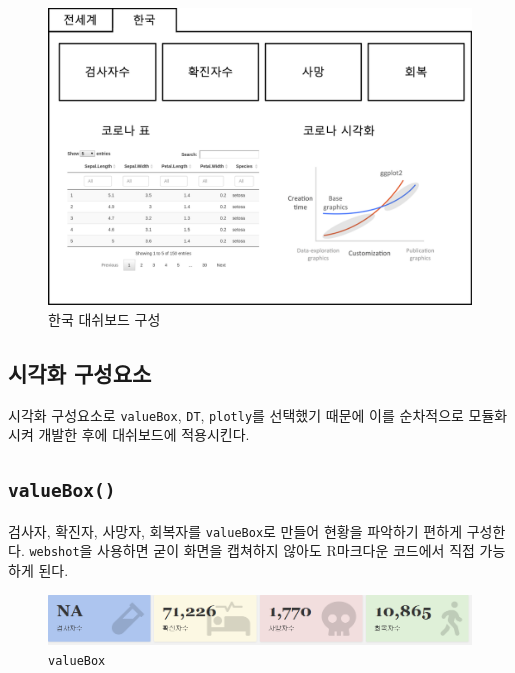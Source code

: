 \documentclass[
  letterpaper,
]{book}
\begin{document}
\begin{figure}

{\centering \includegraphics{images/corona-korea.png}

}

\caption{한국 대쉬보드 구성}

\end{figure}

\hypertarget{corona-korea-dashboard-component}{%
\subsection{시각화 구성요소}\label{corona-korea-dashboard-component}}

시각화 구성요소로 \texttt{valueBox}, \texttt{DT}, \texttt{plotly}를
선택했기 때문에 이를 순차적으로 모듈화시켜 개발한 후에 대쉬보드에
적용시킨다.

\hypertarget{corona-korea-valueBox}{%
\subsection{\texorpdfstring{\texttt{valueBox()}}{valueBox()}}\label{corona-korea-valueBox}}

검사자, 확진자, 사망자, 회복자를 \texttt{valueBox}로 만들어 현황을
파악하기 편하게 구성한다. \texttt{webshot}을 사용하면 굳이 화면을
캡쳐하지 않아도 R마크다운 코드에서 직접 가능하게 된다.

\begin{figure}

{\centering \includegraphics{images/korea-valueBox.png}

}

\caption{\texttt{valueBox}}

\end{figure}
\end{document}
